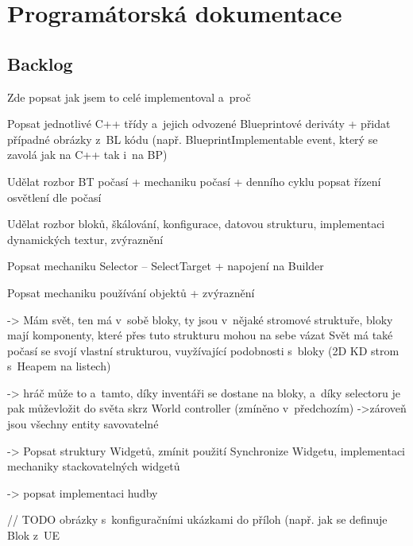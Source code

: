 
\chapter{Programátorská dokumentace}







\section{Backlog}

Zde popsat jak jsem to celé implementoval a~proč


Popsat jednotlivé C++ třídy a~jejich odvozené Blueprintové deriváty + přidat případné obrázky z~BL kódu (např. BlueprintImplementable event, který se zavolá jak na C++ tak i~na BP) 

Udělat rozbor BT počasí + mechaniku počasí + denního cyklu
popsat řízení osvětlení dle počasí

Udělat rozbor bloků, škálování, konfigurace, datovou strukturu, implementaci dynamických textur, zvýraznění

Popsat mechaniku Selector -- SelectTarget + napojení na Builder

Popsat mechaniku používání objektů + zvýraznění

-> Mám svět, ten má v~sobě bloky, ty jsou v~nějaké stromové struktuře, bloky mají komponenty, které přes tuto strukturu mohou na sebe vázat
Svět má také počasí se svojí vlastní strukturou, vuyžívající podobnosti s~bloky (2D KD strom s~Heapem na listech)

-> hráč může to a~tamto, díky inventáři se dostane na bloky, a~díky selectoru je pak můževložit do světa skrz World controller (zmíněno v~předchozím)
->zároveň jsou všechny entity savovatelné 


-> Popsat struktury Widgetů, zmínit použití Synchronize Widgetu, implementaci mechaniky stackovatelných widgetů

-> popsat implementaci hudby




// TODO obrázky s~konfiguračními ukázkami do příloh (např. jak se definuje Blok z~UE


